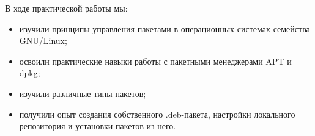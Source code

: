 
В ходе практической работы мы:
\begin{itemize}
	\item изучили принципы управления пакетами в операционных системах семейства GNU/Linux;
	\item освоили практические навыки работы с пакетными менеджерами APT и dpkg;
	\item изучили различные типы пакетов;
	\item получили опыт создания собственного .deb-пакета, настройки локального репозитория и установки пакетов из него.
\end{itemize}
